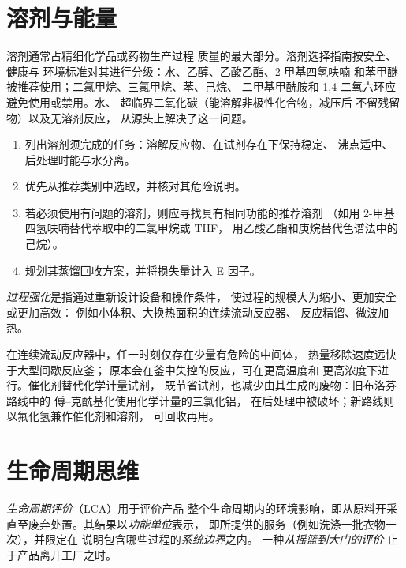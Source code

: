 \section{溶剂与能量}

溶剂通常占精细化学品或药物生产过程
质量的最大部分。溶剂选择指南按安全、健康与
环境标准对其进行分级：水、乙醇、乙酸乙酯、2-甲基四氢呋喃
和苯甲醚被推荐使用；二氯甲烷、三氯甲烷、苯、己烷、
二甲基甲酰胺和 1,4-二氧六环应避免使用或禁用。水、
超临界二氧化碳（能溶解非极性化合物，减压后
不留残留物）以及无溶剂反应，
从源头上解决了这一问题。

\begin{method}[使用溶剂选择指南]\label{met:b3:green-industrial:solvent-choice}
\begin{enumerate}
  \item 列出溶剂须完成的任务：溶解反应物、在试剂存在下保持稳定、
        沸点适中、后处理时能与水分离。
  \item 优先从推荐类别中选取，并核对其危险说明。
  \item 若必须使用有问题的溶剂，则应寻找具有相同功能的推荐溶剂
        （如用 2-甲基四氢呋喃替代萃取中的二氯甲烷或 THF，
        用乙酸乙酯和庚烷替代色谱法中的己烷）。
  \item 规划其蒸馏回收方案，并将损失量计入 E 因子。
\end{enumerate}
\end{method}

\begin{definition}[过程强化]\label{def:b3:green-industrial:intensification}
\emph{过程强化}是指通过重新设计设备和操作条件，
使过程的规模大为缩小、更加安全或更加高效：
例如小体积、大换热面积的连续流动反应器、
反应精馏、微波加热。
\end{definition}

在连续流动反应器中，任一时刻仅存在少量有危险的中间体，
热量移除速度远快于大型间歇反应釜；
原本会在釜中失控的反应，可在更高温度和
更高浓度下进行。催化剂替代化学计量试剂，
既节省试剂，也减少由其生成的废物：旧布洛芬路线中的
傅–克酰基化使用化学计量的三氯化铝，
在后处理中被破坏；新路线则以氟化氢兼作催化剂和溶剂，
可回收再用。

\section{生命周期思维}

\begin{definition}[生命周期评价]\label{def:b3:green-industrial:lca}
\emph{生命周期评价}（LCA）用于评价产品
整个生命周期内的环境影响，即从原料开采
直至废弃处置。其结果以\emph{功能单位}表示，
即所提供的服务（例如洗涤一批衣物一次），并限定在
说明包含哪些过程的\emph{系统边界}之内。
一种\emph{从摇篮到大门的评价}
止于产品离开工厂之时。
\end{definition}

